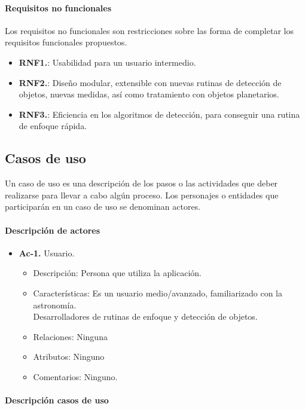 \paragraph{Requisitos no funcionales}

Los requisitos no funcionales son restricciones sobre las forma de completar los requisitos funcionales propuestos. 

\begin{itemize}
	\item \textbf{RNF1.}:  Usabilidad para un usuario intermedio.
	\item \textbf{RNF2.}: Diseño modular, extensible con nuevas rutinas de detección de objetos, nuevas medidas, así como tratamiento con objetos planetarios.
	\item \textbf{RNF3.}: Eficiencia en los algoritmos de detección, para conseguir una rutina de enfoque rápida.
\end{itemize}

\subsection{Casos de uso}

Un caso de uso es una descripción de los pasos o las actividades que deber realizarse para llevar a cabo algún proceso. 
Los personajes o entidades que participarán en un caso de uso se denominan actores.

\paragraph{Descripción de actores}

\begin{itemize}
\item \textbf{Ac-1.} Usuario.
	\begin{itemize}
		\item Descripción: Persona que utiliza la aplicación.
		\item Características: Es un usuario medio/avanzado, familiarizado con la astronomía.\\
		      Desarrolladores de rutinas de enfoque y detección de objetos.
		\item Relaciones: Ninguna
		\item Atributos: Ninguno
		\item Comentarios: Ninguno.
	\end{itemize}
\end{itemize}


\paragraph{Descripción casos de uso}

